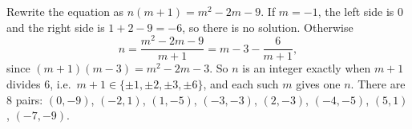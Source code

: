 Rewrite the equation as $n(m+1)=m^2-2m-9$. If $m=-1$, the left side is $0$ and the right side is $1+2-9=-6$, so there is no solution. Otherwise
\[
n=\dfrac{m^2-2m-9}{m+1}=m-3-\dfrac{6}{m+1},
\]
since $(m+1)(m-3)=m^2-2m-3$. So $n$ is an integer exactly when $m+1$ divides $6$, i.e.\ $m+1\in\{\pm1,\pm2,\pm3,\pm6\}$, and each such $m$ gives one $n$. There are $\boxed{8}$ pairs: $(0,-9)$, $(-2,1)$, $(1,-5)$, $(-3,-3)$, $(2,-3)$, $(-4,-5)$, $(5,1)$, $(-7,-9)$.
